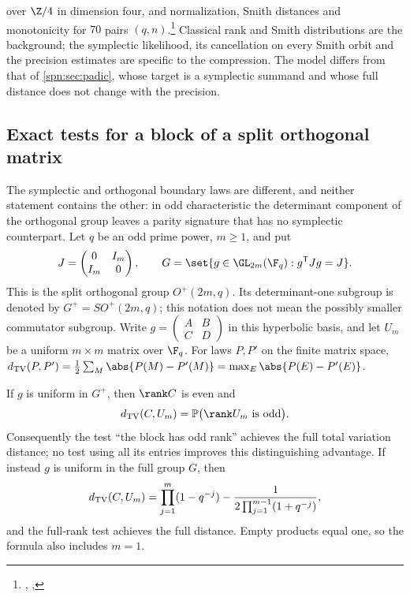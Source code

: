 over $\Z/4$ in dimension four, and normalization, Smith distances and monotonicity for $70$ pairs
$(q,n)$.\footnote{\raggedright{},
,
}
Classical rank and Smith distributions \cite{Fulman2015Stein,WangStanley2017Smith} are the background;
the symplectic likelihood, its cancellation on every Smith orbit and the precision estimates are
specific to the compression. The model differs from that of \cref{spn:sec:padic}, whose target is a
symplectic summand and whose full distance does not change with the precision.

\subsection{Exact tests for a block of a split orthogonal matrix}\label{spn:sec:orthogonal}

The symplectic and orthogonal boundary laws are different, and neither
statement contains the other: in odd characteristic the determinant
component of the orthogonal group leaves a parity signature that has no
symplectic counterpart. Let $q$ be an odd prime power, $m\ge1$, and put
\[
 J=\begin{pmatrix}0&I_m\\I_m&0\end{pmatrix},\qquad
 G=\set{g\in\GL_{2m}(\F_q):g^{\spnT}Jg=J}.
\]
This is the split orthogonal group $O^+(2m,q)$. Its determinant-one subgroup
is denoted by $G^+=SO^+(2m,q)$; this notation does not mean the possibly
smaller commutator subgroup. Write
$g=\left(\begin{smallmatrix}A&B\\C&D\end{smallmatrix}\right)$ in this
hyperbolic basis, and let $U_m$ be a uniform $m\times m$ matrix over $\F_q$.
For laws $P,P'$ on the finite matrix space,
$\spnTV(P,P')=\frac12\sum_M\abs{P(M)-P'(M)}=\max_E\abs{P(E)-P'(E)}$.

\begin{theorem}\label{spn:thm:orthogonal}
If $g$ is uniform in $G^+$, then $\rank C$ is even and
\begin{equation}\label{spn:eq:SO-TV}
 \spnTV(C,U_m)=\spnP\bigl(\rank U_m\text{ is odd}\bigr).
\end{equation}
Consequently the test ``the block has odd rank'' achieves the full total
variation distance; no test using all its entries improves this
distinguishing advantage. If instead $g$ is uniform in the full group $G$,
then
\begin{equation}\label{spn:eq:O-TV}
 d_{\mathrm{TV}}(C,U_m)=\prod_{j=1}^{m}(1-q^{-j})
 -\frac{1}{2\prod_{j=1}^{m-1}(1+q^{-j})},
\end{equation}
and the full-rank test achieves the full distance. Empty products equal one,
so the formula also includes $m=1$.
\end{theorem}

